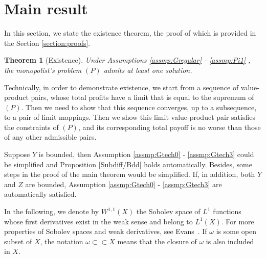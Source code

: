 \documentclass[a4paper, 11pt]{amsart}
\numberwithin{equation}{section}
\theoremstyle{plain}
\newtheorem{theorem}{Theorem}[section]
\theoremstyle{definition}
\theoremstyle{remark}
\begin{document}
 

 







\bigskip





\bigskip







\section{Main result}\label{section:mainresult}
In this section, we state the existence theorem, the proof of which is provided in the Section \ref{section:proofs}. 


\begin{theorem}[Existence]\label{maintheorem}
	Under Assumptions \ref{assmp:Gregular} - \ref{assmp:Pi1}%
	, the monopolist's problem $(P)$ admits at least one solution.
\end{theorem}

Technically, in order to demonstrate existence, we start from a sequence of value-product pairs, whose total profits have a limit that is equal to the supremum of $(P)$.
Then we need to show that this sequence converges, up to a subsequence, to a pair of limit mappings. Then we show this limit value-product pair satisfies the constraints of $(P)$, and its corresponding total payoff is no worse than those of any other admissible pairs. \medskip

Suppose $Y$ is bounded, then Assumption \ref{assmp:Gtech0} - \ref{assmp:Gtech3} could be simplified and Proposition \ref{Subdiff/Bdd} holds automatically. Besides, some steps in the proof of the main theorem would be simplified. If, in addition, both $Y$ and $Z$ are bounded, Assumption \ref{assmp:Gtech0} - \ref{assmp:Gtech3} are automatically satisfied.%
\medskip

In the following, we denote by $W^{1,1}(X)$  the Sobolev space of $L^1$ functions whose first derivatives exist in the weak sense and belong to $L^1(X)$. For more properties of Sobolev spaces and weak derivatives, see Evans~\cite[Chapter 5]{Evans98}. If $\omega$ is some open subset of $X$, the notation $\omega \subset \subset X$ means that the closure of $\omega$ is also included in $X$.\medskip
\end{document}
